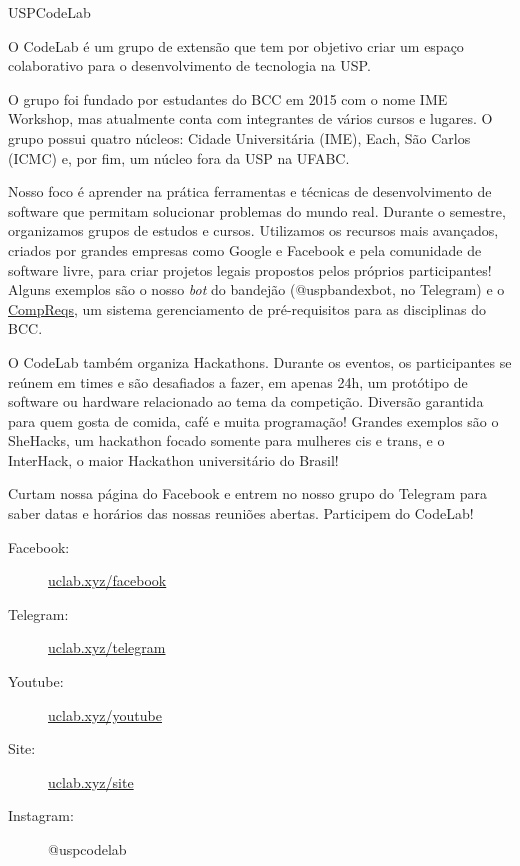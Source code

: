 \begin{subsecao}{USPCodeLab}


O CodeLab é um grupo de extensão que tem por objetivo criar um espaço
colaborativo para o desenvolvimento de tecnologia na USP.

O grupo foi fundado por estudantes do BCC em 2015 com o nome IME Workshop, mas atualmente
conta com integrantes de vários cursos e lugares. O grupo possui quatro núcleos: Cidade Universitária (IME),
Each, São Carlos (ICMC) e, por fim, um núcleo fora da USP na UFABC.

Nosso foco é aprender
na prática ferramentas e técnicas de desenvolvimento de software que permitam
solucionar problemas do mundo real. Durante o semestre, organizamos grupos de estudos e cursos.
Utilizamos os recursos mais avançados, criados por grandes empresas como Google
e Facebook e pela comunidade de software livre, para criar projetos legais
propostos pelos próprios participantes! Alguns exemplos são o nosso \textit{bot}
do bandejão (@uspbandexbot, no Telegram) e o  \href{http://compreqs.surge.sh/}{CompReqs}, um sistema gerenciamento
de pré-requisitos para as disciplinas do BCC.

O CodeLab também organiza Hackathons. Durante os eventos, os participantes se reúnem em times e são
desafiados a fazer, em apenas 24h, um protótipo de software ou hardware
relacionado ao tema da competição. Diversão garantida para quem gosta de comida,
café e muita programação! Grandes exemplos são o SheHacks, um hackathon focado somente para mulheres
cis e trans, e o InterHack, o maior Hackathon universitário do Brasil!

Curtam nossa página do Facebook e entrem no nosso grupo do Telegram para saber
datas e horários das nossas reuniões abertas. Participem do CodeLab!

\begin{description}
\item[Facebook:] \url{uclab.xyz/facebook}
\item[Telegram:] \url{uclab.xyz/telegram}
\item[Youtube:] \url{uclab.xyz/youtube}
\item[Site:] \url{uclab.xyz/site}
\item[Instagram:] @uspcodelab
\end{description}

\end{subsecao}
